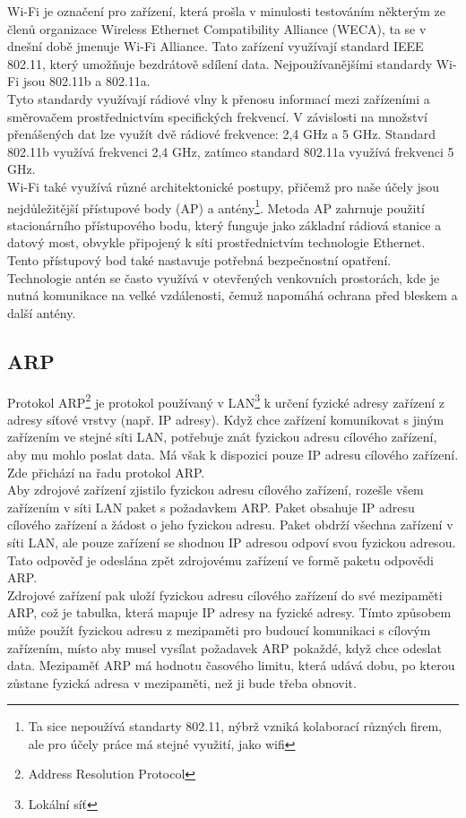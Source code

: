 \documentclass[12pt]{report}			%
\begin{document}
Wi-Fi je označení pro zařízení, která prošla v minulosti testováním některým ze členů organizace Wireless Ethernet Compatibility Alliance (WECA), ta se v dnešní době jmenuje Wi-Fi Alliance. Tato zařízení využívají standard IEEE 802.11, který umožňuje bezdrátově sdílení data. Nejpoužívanějšími standardy Wi-Fi jsou 802.11b a 802.11a.
\\
Tyto standardy využívají rádiové vlny k přenosu informací mezi zařízeními a směrovačem prostřednictvím specifických frekvencí. V závislosti na množství přenášených dat lze využít dvě rádiové frekvence: 2,4 GHz a 5 GHz. Standard 802.11b využívá frekvenci 2,4 GHz, zatímco standard 802.11a využívá frekvenci 5 GHz.
\\
Wi-Fi také využívá různé architektonické postupy, přičemž pro naše účely jsou nejdůležitější přístupové body (AP) a antény\footnote{Ta sice nepoužívá standarty 802.11, nýbrž vzniká kolaborací různých firem, ale pro účely práce má stejné využití, jako wifi}. Metoda AP zahrnuje použití stacionárního přístupového bodu, který funguje jako základní rádiová stanice a datový most, obvykle připojený k síti prostřednictvím technologie Ethernet. Tento přístupový bod také nastavuje potřebná bezpečnostní opatření.
\\
Technologie antén se často využívá v otevřených venkovních prostorách, kde je nutná komunikace na velké vzdálenosti, čemuž napomáhá ochrana před bleskem a další antény.



\cite{WiFi1}
\cite{WiFi2}
\cite{WiFi3}
\cite{Pruvodce}
				\subsection{ARP}
Protokol ARP\footnote{Address Resolution Protocol} je protokol používaný v LAN\footnote{Lokální síť} k určení fyzické adresy zařízení z adresy síťové vrstvy (např. IP adresy). Když chce zařízení komunikovat s jiným zařízením ve stejné síti LAN, potřebuje znát fyzickou adresu cílového zařízení, aby mu mohlo poslat data. Má však k dispozici pouze IP adresu cílového zařízení. Zde přichází na řadu protokol ARP.
\\
Aby zdrojové zařízení zjistilo fyzickou adresu cílového zařízení, rozešle všem zařízením v síti LAN paket s požadavkem ARP. Paket obsahuje IP adresu cílového zařízení a žádost o jeho fyzickou adresu. Paket obdrží všechna zařízení v síti LAN, ale pouze zařízení se shodnou IP adresou odpoví svou fyzickou adresou. Tato odpověď je odeslána zpět zdrojovému zařízení ve formě paketu odpovědi ARP.
\\
Zdrojové zařízení pak uloží fyzickou adresu cílového zařízení do své mezipaměti ARP, což je tabulka, která mapuje IP adresy na fyzické adresy. Tímto způsobem může použít fyzickou adresu z mezipaměti pro budoucí komunikaci s cílovým zařízením, místo aby musel vysílat požadavek ARP pokaždé, když chce odeslat data. Mezipaměť ARP má hodnotu časového limitu, která udává dobu, po kterou zůstane fyzická adresa v mezipaměti, než ji bude třeba obnovit.
\end{document}
